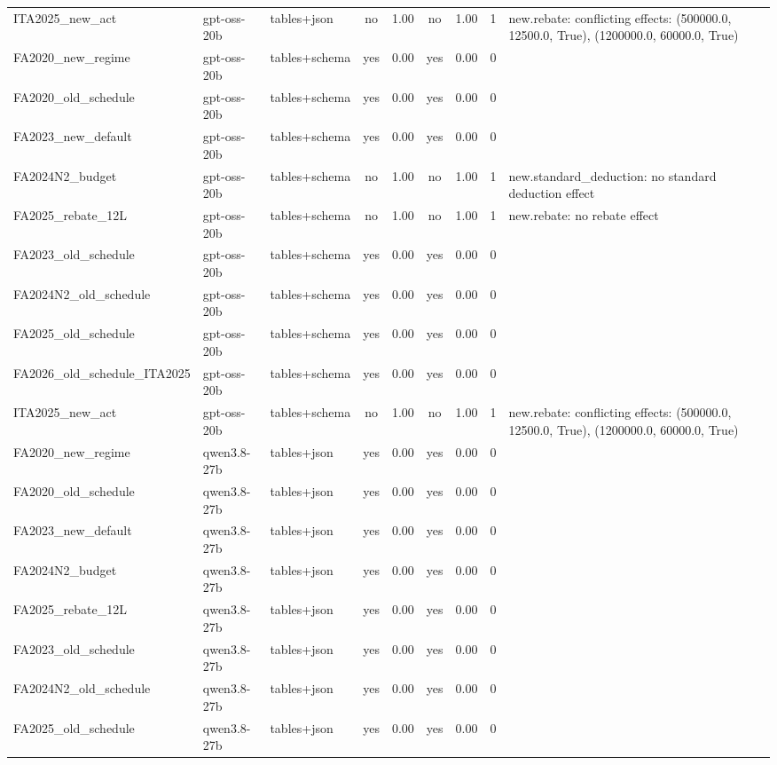 \begin{table}[t]
\begin{tabular}{lllcrcrrl}
ITA2025\_new\_act & gpt-oss-20b & tables+json & no & 1.00 & no & 1.00 & 1 & new.rebate: conflicting effects: (500000.0, 12500.0, True), (1200000.0, 60000.0, True) \\
FA2020\_new\_regime & gpt-oss-20b & tables+schema & yes & 0.00 & yes & 0.00 & 0 &  \\
FA2020\_old\_schedule & gpt-oss-20b & tables+schema & yes & 0.00 & yes & 0.00 & 0 &  \\
FA2023\_new\_default & gpt-oss-20b & tables+schema & yes & 0.00 & yes & 0.00 & 0 &  \\
FA2024N2\_budget & gpt-oss-20b & tables+schema & no & 1.00 & no & 1.00 & 1 & new.standard\_deduction: no standard deduction effect \\
FA2025\_rebate\_12L & gpt-oss-20b & tables+schema & no & 1.00 & no & 1.00 & 1 & new.rebate: no rebate effect \\
FA2023\_old\_schedule & gpt-oss-20b & tables+schema & yes & 0.00 & yes & 0.00 & 0 &  \\
FA2024N2\_old\_schedule & gpt-oss-20b & tables+schema & yes & 0.00 & yes & 0.00 & 0 &  \\
FA2025\_old\_schedule & gpt-oss-20b & tables+schema & yes & 0.00 & yes & 0.00 & 0 &  \\
FA2026\_old\_schedule\_ITA2025 & gpt-oss-20b & tables+schema & yes & 0.00 & yes & 0.00 & 0 &  \\
ITA2025\_new\_act & gpt-oss-20b & tables+schema & no & 1.00 & no & 1.00 & 1 & new.rebate: conflicting effects: (500000.0, 12500.0, True), (1200000.0, 60000.0, True) \\
FA2020\_new\_regime & qwen3.8-27b & tables+json & yes & 0.00 & yes & 0.00 & 0 &  \\
FA2020\_old\_schedule & qwen3.8-27b & tables+json & yes & 0.00 & yes & 0.00 & 0 &  \\
FA2023\_new\_default & qwen3.8-27b & tables+json & yes & 0.00 & yes & 0.00 & 0 &  \\
FA2024N2\_budget & qwen3.8-27b & tables+json & yes & 0.00 & yes & 0.00 & 0 &  \\
FA2025\_rebate\_12L & qwen3.8-27b & tables+json & yes & 0.00 & yes & 0.00 & 0 &  \\
FA2023\_old\_schedule & qwen3.8-27b & tables+json & yes & 0.00 & yes & 0.00 & 0 &  \\
FA2024N2\_old\_schedule & qwen3.8-27b & tables+json & yes & 0.00 & yes & 0.00 & 0 &  \\
FA2025\_old\_schedule & qwen3.8-27b & tables+json & yes & 0.00 & yes & 0.00 & 0 &  \\

\end{tabular}
\end{table}
